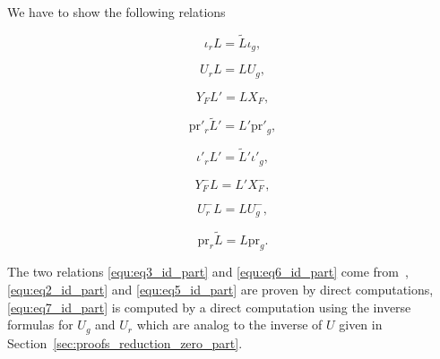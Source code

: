 \documentclass{ifacconf}
\newcommand\p{\text{pr}}
\begin{document}
We have to show the following relations
\vspace{-0.4cm}
\begin{small}
  \begin{multicols}{3}
    \begin{equation}\label{equ:eq1_id_part}
      \iota_rL=\tilde{L}\iota_g,
    \end{equation}
    
    \begin{equation}\label{equ:eq2_id_part}
      U_rL=LU_g,
    \end{equation}
    
    \begin{equation}\label{equ:eq3_id_part}
      Y_FL'=LX_F,
    \end{equation}
    
    \begin{equation}\label{equ:eq4_id_part}
      \p'_r\tilde{L}'=L'\p'_g,
    \end{equation}
    
    \begin{equation}\label{equ:eq5_id_part}
      \iota'_rL'=\tilde{L}'\iota'_g,
    \end{equation}
    
    \begin{equation}\label{equ:eq6_id_part}
      Y_F^-L=L'X_F^-,
    \end{equation}
    
    \begin{equation}\label{equ:eq7_id_part}
      U_r^-L=LU_g^-, 
    \end{equation}
    
    \begin{equation}\label{equ:eq8_id_part}
      \p_r\tilde{L}=L\p_g.
    \end{equation}
  \end{multicols}
\end{small}

The two relations \eqref{equ:eq3_id_part} and \eqref{equ:eq6_id_part}
come from~\cite{ClQu:11}, \eqref{equ:eq2_id_part} and
\eqref{equ:eq5_id_part} are proven by direct computations,
\eqref{equ:eq7_id_part} is computed by a direct computation using the
inverse formulas for $U_g$ and $U_r$ which are analog to the inverse of
$U$ given in Section~\ref{sec:proofs_reduction_zero_part}.
\end{document}

